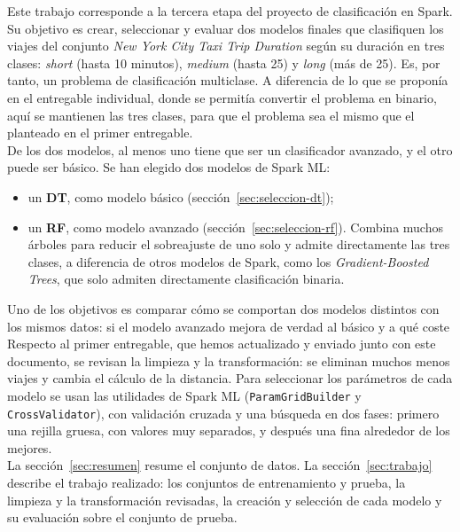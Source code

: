 \documentclass[12pt,a4paper]{article}
\begin{document}
Este trabajo corresponde a la tercera etapa del proyecto de clasificación en Spark. Su objetivo es crear, seleccionar y evaluar dos modelos finales que clasifiquen los viajes del conjunto \textit{New York City Taxi Trip Duration} según su duración en tres clases: \textit{short} (hasta 10 minutos), \textit{medium} (hasta 25) y \textit{long} (más de 25). Es, por tanto, un problema de clasificación multiclase. A diferencia de lo que se proponía en el entregable individual, donde se permitía convertir el problema en binario, aquí se mantienen las tres clases, para que el problema sea el mismo que el planteado en el primer entregable.\\

De los dos modelos, al menos uno tiene que ser un clasificador avanzado, y
el otro puede ser básico. Se han elegido dos modelos de Spark ML:
\begin{itemize}
    \item un \textbf{\ac{DT}}, como modelo básico
    (sección~\ref{sec:seleccion-dt});
    \item un \textbf{\ac{RF}}, como modelo avanzado
    (sección~\ref{sec:seleccion-rf}). Combina muchos árboles para reducir el
    sobreajuste de uno solo y admite directamente las tres clases, a
    diferencia de otros modelos de Spark, como los \textit{Gradient-Boosted
    Trees}, que solo admiten directamente clasificación binaria.
\end{itemize}
Uno de los objetivos es comparar cómo se comportan dos modelos distintos con
los mismos datos: si el modelo avanzado mejora de verdad al básico y a qué
coste\\

Respecto al primer entregable, que hemos actualizado y enviado junto
con este documento, se revisan la limpieza y la transformación: se eliminan
muchos menos viajes y cambia el cálculo de la distancia. Para seleccionar
los parámetros de cada modelo se usan las utilidades de Spark ML
(\texttt{ParamGridBuilder} y \texttt{CrossValidator}), con validación
cruzada y una búsqueda en dos fases: primero una rejilla gruesa, con valores
muy separados, y después una fina alrededor de los mejores.\\

La sección~\ref{sec:resumen} resume el conjunto de datos. La sección~\ref{sec:trabajo} describe el trabajo realizado: los conjuntos de entrenamiento y prueba, la limpieza y la transformación revisadas, la creación y selección de cada modelo y su evaluación sobre el conjunto de prueba.
\end{document}
